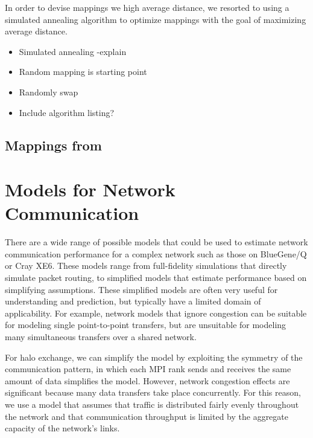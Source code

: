\documentclass{acm_proc_article-sp}
\begin{document}
In order to devise mappings we high average distance, we resorted
to using a simulated annealing algorithm to optimize mappings
with the goal of maximizing average distance.

\begin{itemize}
  \item Simulated annealing -explain
  \item Random mapping is starting point
  \item Randomly swap 
  \item Include algorithm listing?
\end{itemize}

\subsection{Mappings from }



\section{Models for Network Communication}

There are a wide range of possible models that could be used to
estimate network communication performance for a complex network
such as those on BlueGene/Q or Cray XE6.  These models range from
full-fidelity simulations that directly simulate packet routing, to
simplified models that estimate performance based on simplifying
assumptions.  These simplified models are often very useful for
understanding and prediction, but typically have a limited domain
of applicability.  For example, network models that ignore congestion
can be suitable for modeling single point-to-point transfers, but are
unsuitable for modeling many simultaneous transfers over a shared network.

For halo exchange, we can simplify the model by exploiting the
symmetry of the communication pattern, in which each MPI rank sends
and receives the same amount of data simplifies the model.  However,
network congestion effects are significant because many data transfers
take place concurrently.  For this reason, we use a model that assumes
that traffic is distributed fairly evenly throughout the network and
that communication throughput is limited by the aggregate capacity
of the network's links.
\end{document}
